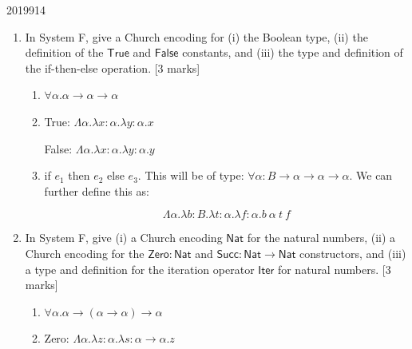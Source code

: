 \documentclass[10pt,\jkfside,a4paper]{article}
\newcommand{\answer}[1]{
    \begin{tcolorbox}[colframe=black, colback=white, sharp corners, boxrule=0.2mm, breakable]
        #1
    \end{tcolorbox}
}
\newcommand{\qmarks}[1]{\hspace*{\fill}[#1]}
\begin{document}
\begin{examquestion}{2019}{9}{14}
    \begin{enumerate}
        \item
            In System F, give a Church encoding for (i) the Boolean type, (ii) the
            definition of the $\mathsf{True}$ and $\mathsf{False}$ constants, and (iii)
            the type and definition of the if-then-else operation. \qmarks{3 marks}

            \answer{ 
                \begin{enumerate} 
                    \item 
                    $\forall \alpha. \alpha \to \alpha \to \alpha$

                    \item
                    True: $\Lambda \alpha. \lambda x: \alpha . \lambda y: \alpha. x$

                    False: $\Lambda \alpha. \lambda x: \alpha . \lambda y: \alpha. y$

                    \item
                    if $e_1$ then $e_2$ else $e_3$. This will be of type: $\forall \alpha: B \to \alpha \to \alpha \to \alpha$. We can further define this as: 

                    \[ 
                        \Lambda \alpha. \lambda b: B. \lambda t: \alpha . \lambda f: \alpha. b \  \alpha \  t \  f 
                    \]

                \end{enumerate}
            }

        \item
            In System F, give (i) a Church encoding $\mathsf{Nat}$ for the natural
            numbers, (ii) a Church encoding for the $\mathsf{Zero} : \mathsf{Nat}$ and
            $\mathsf{Succ} : \mathsf{Nat} \to \mathsf{Nat}$ constructors, and (iii) a type
            and definition for the iteration operator $\mathsf{Iter}$ for natural
            numbers. \qmarks{3 marks}

            \answer{ 
                \begin{enumerate} 
                    \item 
                    $\forall \alpha. \alpha \to (\alpha \to \alpha) \to \alpha$

                    \item
                    Zero: $\Lambda \alpha. \lambda z:\alpha . \lambda s:\alpha \to \alpha. z$


\end{enumerate}}
\end{enumerate}
\end{examquestion}
\end{document}

